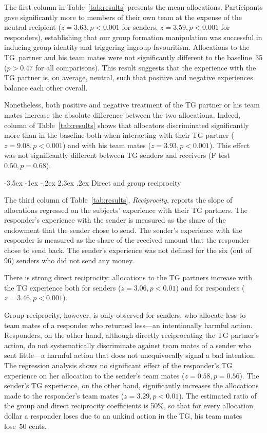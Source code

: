 \documentclass[12pt,a4paper]{article}\usepackage[]{graphicx}\usepackage[]{color}
\makeatletter
\renewcommand\subsection{\@startsection {subsection}{1}{\z@}%
{-3.5ex \@plus -1ex \@minus -.2ex}%
{2.3ex \@plus.2ex}%
{\it\large}}
\makeatother
\begin{document}
The first column in Table~\ref{tab:results} presents the mean allocations.
Participants gave significantly more to members of their own team at the expense
of the neutral recipient ($z=3.63,p< 0.001$ for senders, 
$z=3.59,p< 0.001$ for
responders), establishing that our group formation manipulation was successful
in inducing group identity and triggering ingroup favouritism. Allocations to
the TG~partner and his team mates were not significantly different to the
baseline~35 ($p>0.47$ for all comparisons). This result suggests that the experience with the TG partner is, on average, neutral, such that positive and negative experiences balance each other overall.

Nonetheless, both positive and negative treatment of the TG partner or his team mates increase the absolute difference between the two allocationa. Indeed,
column of Table~\ref{tab:results} shows that allocators discriminated significantly more
than in the baseline both when interacting with their TG partner
($z=9.08,p< 0.001$) and with his team mates 
($z=3.93,p< 0.001$). This effect was not
significantly different between TG senders and receivers (F test $0.50,
p= 0.68$).

\subsection{Direct and group reciprocity}
\label{sec:reciprocity}

The third column of Table~\ref{tab:results}, \emph{Reciprocity}, reports the slope of
allocations regressed on the subjects' experience with their TG partners. 
The responder's experience with the sender is measured
as the share of the endowment that the sender chose to send. The sender's experience with the responder is measured as the share
of the received amount that the responder chose to send back. 
The sender's experience was not defined
for the six (out of 96) senders who did not send any money.

There is strong direct reciprocity: allocations
to the TG partners increase with the TG experience both for
senders ($z=3.06,p< 0.01$) and for responders 
($z=3.46,p< 0.001$).

Group reciprocity, however, is only observed for senders, who allocate
less to team mates of a responder who returned less---an intentionally harmful action.
Responders, on the other hand, although directly reciprocating the
TG partner's action, do not systematically discriminate against team mates
of a sender who sent little---a harmful action that does not unequivocally
signal a bad intention. The regression analysis shows no significant
effect of the responder's TG experience on her allocation to the sender's
team mates ($z=0.58,p= 0.56$). 
The sender's TG experience, on the other
hand, significantly increases the allocations made to the responder's team mates 
($z=3.29,p< 0.01$).
The estimated ratio of the group and direct reciprocity coefficients
is 50\%, so that for every allocation dollar a responder
loses due to an unkind action in the TG, his team mates lose~50 cents.
\end{document}
